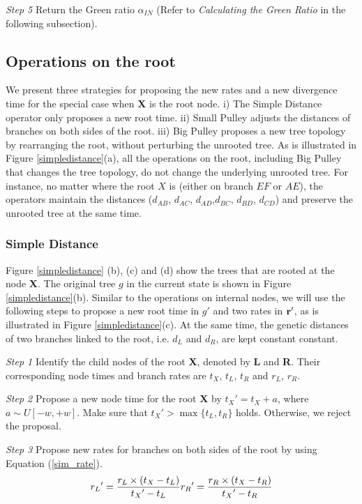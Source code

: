 \documentclass{bmcart}
\begin{document}
\emph{Step 5} Return the Green ratio ${\alpha_{IN}}$ (Refer to \textit{Calculating the Green Ratio} in the following subsection).

\subsection*{Operations on the root}
We present three strategies for proposing the new rates and a new divergence time for the special case when \textbf{X} is the root node. i) The Simple Distance operator only proposes a new root time. ii) Small Pulley adjusts the distances of branches on both sides of the root. iii) Big Pulley proposes a new tree topology by rearranging the root, without perturbing the unrooted tree. As is illustrated in Figure \ref{simpledistance}(a), all the operations on the root, including Big Pulley that changes the tree topology, do not change the underlying unrooted tree. For instance, no matter where the root $X$ is (either on branch $EF$ or $AE$), the operators maintain the distances ($d_{AB}$, $d_{AC}$, $d_{AD}$,$d_{BC}$, $d_{BD}$, $d_{CD}$) and preserve the unrooted tree at the same time.

\subsubsection*{Simple Distance}
Figure \ref{simpledistance} (b), (c) and (d) show the trees that are rooted at the node \textbf{X}. The original tree $g$ in the current state is shown in Figure \ref{simpledistance}(b). Similar to the operations on internal nodes, we will use the following steps to propose a new root time in ${g}'$ and two rates in $\bf{r}'$, as is illustrated in Figure \ref{simpledistance}(c). At the same time, the genetic distances of two branches linked to the root, i.e. $d_L$ and $d_R$, are kept constant constant.

\emph{Step 1} Identify the child nodes of the root \textbf{X}, denoted by \textbf{L} and \textbf{R}. Their corresponding node times and branch rates are $t_X$, $t_L$, $t_R$ and $r_L$, $r_R$.

\emph{Step 2} Propose a new node time for the root \textbf{X} by ${t_X}' = {t_X} + a$, where $a \sim U[ - w, + w]$. Make sure that ${t_X}' > \max \{ {t_L}, {t_R}\} $ holds. Otherwise, we reject the proposal.

\emph{Step 3} Propose new rates for branches on both sides of the root by using Equation (\ref{sim_rate}).
\begin{equation}
\label{sim_rate}
{r_L}' = \frac{{{r_L} \times ({{t_X} - {t_L}})}}{{{t_X}' - {t_L}}}\\
{r_R}' = \frac{{{r_R} \times ({{t_X} - {t_R}})}}{{{t_X}' - {t_R}}}
 \end{equation}
\end{document}
